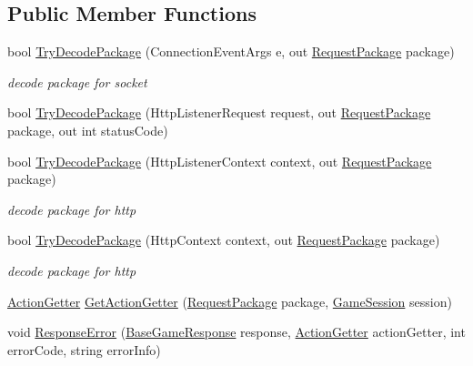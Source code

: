 \subsection*{Public Member Functions}
\begin{DoxyCompactItemize}
\item 
bool \mbox{\hyperlink{interface_t_net_1_1_contract_1_1_i_action_dispatcher_a6cd207fe8c2c4c6af269c24cf7a12f43}{Try\+Decode\+Package}} (Connection\+Event\+Args e, out \mbox{\hyperlink{class_t_net_1_1_contract_1_1_request_package}{Request\+Package}} package)
\begin{DoxyCompactList}\small\item\em decode package for socket \end{DoxyCompactList}\item 
bool \mbox{\hyperlink{interface_t_net_1_1_contract_1_1_i_action_dispatcher_a689e3bea000c3e52404e890d20226617}{Try\+Decode\+Package}} (Http\+Listener\+Request request, out \mbox{\hyperlink{class_t_net_1_1_contract_1_1_request_package}{Request\+Package}} package, out int status\+Code)
\item 
bool \mbox{\hyperlink{interface_t_net_1_1_contract_1_1_i_action_dispatcher_a111c0f9bc0cb0c1ba2c72bcbeb0d9ec5}{Try\+Decode\+Package}} (Http\+Listener\+Context context, out \mbox{\hyperlink{class_t_net_1_1_contract_1_1_request_package}{Request\+Package}} package)
\begin{DoxyCompactList}\small\item\em decode package for http \end{DoxyCompactList}\item 
bool \mbox{\hyperlink{interface_t_net_1_1_contract_1_1_i_action_dispatcher_a8de9c448c00d87b1e5c5e97aa7304243}{Try\+Decode\+Package}} (Http\+Context context, out \mbox{\hyperlink{class_t_net_1_1_contract_1_1_request_package}{Request\+Package}} package)
\begin{DoxyCompactList}\small\item\em decode package for http \end{DoxyCompactList}\item 
\mbox{\hyperlink{class_t_net_1_1_service_1_1_action_getter}{Action\+Getter}} \mbox{\hyperlink{interface_t_net_1_1_contract_1_1_i_action_dispatcher_a6c8cd6e4355356d71fba54bc53d7a094}{Get\+Action\+Getter}} (\mbox{\hyperlink{class_t_net_1_1_contract_1_1_request_package}{Request\+Package}} package, \mbox{\hyperlink{class_t_net_1_1_contract_1_1_game_session}{Game\+Session}} session)
\item 
void \mbox{\hyperlink{interface_t_net_1_1_contract_1_1_i_action_dispatcher_a630c4f4ee17ac20278b9dc9cdb4d4990}{Response\+Error}} (\mbox{\hyperlink{class_t_net_1_1_service_1_1_base_game_response}{Base\+Game\+Response}} response, \mbox{\hyperlink{class_t_net_1_1_service_1_1_action_getter}{Action\+Getter}} action\+Getter, int error\+Code, string error\+Info)
\end{DoxyCompactItemize}


